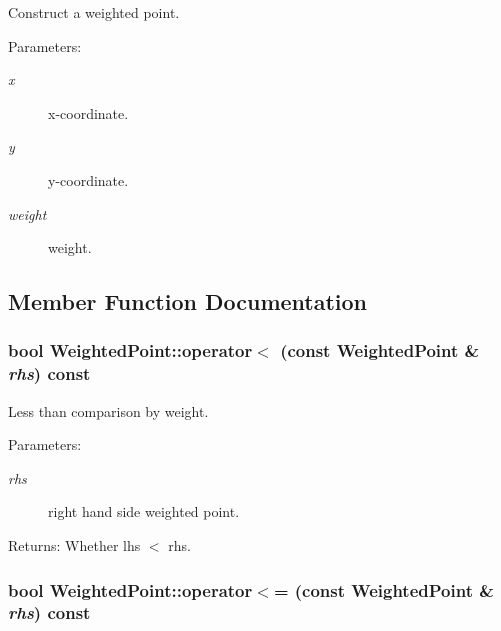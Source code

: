 Construct a weighted point. \begin{Desc}
\item[Parameters:]
\begin{description}
\item[{\em x}]x-coordinate. \item[{\em y}]y-coordinate. \item[{\em weight}]weight. \end{description}
\end{Desc}


\subsection{Member Function Documentation}
\hypertarget{class_weighted_point_714944b15d891557a47a69b4d425da58}{
\subsubsection[{operator$<$}]{\setlength{\rightskip}{0pt plus 5cm}bool WeightedPoint::operator$<$ (const {\bf WeightedPoint} \& {\em rhs}) const}}
\label{class_weighted_point_714944b15d891557a47a69b4d425da58}


Less than comparison by weight. \begin{Desc}
\item[Parameters:]
\begin{description}
\item[{\em rhs}]right hand side weighted point. \end{description}
\end{Desc}
\begin{Desc}
\item[Returns:]Whether lhs $<$ rhs. \end{Desc}
\hypertarget{class_weighted_point_f88df27a98c5849233572da3b504564c}{
\subsubsection[{operator$<$=}]{\setlength{\rightskip}{0pt plus 5cm}bool WeightedPoint::operator$<$= (const {\bf WeightedPoint} \& {\em rhs}) const}}
\label{class_weighted_point_f88df27a98c5849233572da3b504564c}


